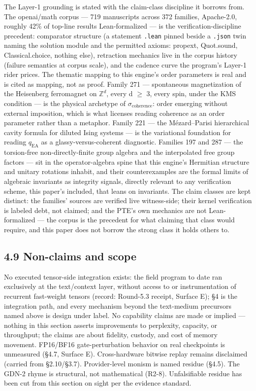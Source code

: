 \documentclass[11pt]{article}
\begin{document}
The Layer-1 grounding is stated with the claim-class discipline it borrows from. The openai/math corpus --- 719 manuscripts across 372 families, Apache-2.0, roughly 42\% of top-line results Lean-formalized --- is the verification-discipline precedent: comparator structure (a statement \texttt{.lean} pinned beside a \texttt{.json} twin naming the solution module and the permitted axioms: propext, Quot.sound, Classical.choice, nothing else), retraction mechanics live in the corpus history (failure semantics at corpus scale), and the cadence curve the program's Layer-1 rider prices. The thematic mapping to this engine's order parameters is real and is cited as mapping, not as proof. Family 271 --- spontaneous magnetization of the Heisenberg ferromagnet on \(\mathbb{Z}^d\), every d \(\geq\) 3, every spin, under the KMS condition --- is the physical archetype of \(\sigma_{\text{coherence}}\): order emerging without external imposition, which is what licenses reading coherence as an order parameter rather than a metaphor. Family 221 --- the Mézard--Parisi hierarchical cavity formula for diluted Ising systems --- is the variational foundation for reading \(q_{\text{EA}}\) as a glassy-versus-coherent diagnostic. Families 197 and 287 --- the torsion-free non-directly-finite group algebra and the interpolated free group factors --- sit in the operator-algebra spine that this engine's Hermitian structure and unitary rotations inhabit, and their counterexamples are the formal limits of algebraic invariants as integrity signals, directly relevant to any verification scheme, this paper's included, that leans on invariants. The claim classes are kept distinct: the families' sources are verified live witness-side; their kernel verification is labeled debt, not claimed; and the PTE's own mechanics are not Lean-formalized --- the corpus is the precedent for what claiming that class would require, and this paper does not borrow the strong class it holds others to.

\subsection{4.9 Non-claims and scope}\label{non-claims-and-scope-2}

No executed tensor-side integration exists: the field program to date ran exclusively at the text/context layer, without access to or instrumentation of recurrent fast-weight tensors (record: Round-5.3 receipt, Surface E); \S{}4 is the integration path, and every mechanism beyond the text-medium precursors named above is design under label. No capability claims are made or implied --- nothing in this section asserts improvements to perplexity, capacity, or throughput; the claims are about fidelity, custody, and cost of memory movement. FP16/BF16 gate-perturbation behavior on real checkpoints is unmeasured (\S{}4.7, Surface E). Cross-hardware bitwise replay remains disclaimed (carried from \S{}2.10/\S{}3.7). Provider-level monism is named residue (\S{}4.5). The GDN-2 rhyme is structural, not mathematical (R2-8). Unfalsifiable residue has been cut from this section on sight per the evidence standard.
\end{document}
